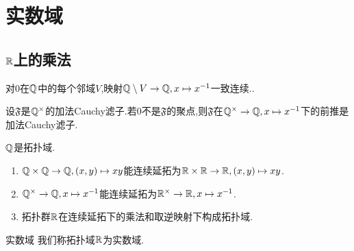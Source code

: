 \chapter{实数域}

\section{\texorpdfstring{$\mathbb{R}$}{R}上的乘法}

\begin{lemma}{}{}
	对$0$在$\mathbb{Q}$中的每个邻域$V$,映射$\mathbb{Q}\setminus V\to\mathbb{Q},x\mapsto x^{-1}$一致连续..
\end{lemma}

\begin{lemma}{}{}
	设$\mathfrak{F}$是$\mathbb{Q}^{\times}$的加法Cauchy滤子.若$0$不是$\mathfrak{F}$的聚点,则$\mathfrak{F}$在$\mathbb{Q}^{\times}\to\mathbb{Q},x\mapsto x^{-1}$下的前推是加法Cauchy滤子.
\end{lemma}

\begin{proposition}{}{}
	$\mathbb{Q}$是拓扑域.
\end{proposition}

\begin{proposition}{}{}
	\begin{enumerate}
		\item $\mathbb{Q}\times\mathbb{Q}\to\mathbb{Q},\left(x,y\right)\mapsto xy$能连续延拓为$\mathbb{R}\times\mathbb{R}\to\mathbb{R},\left(x,y\right)\mapsto xy$.
		\item $\mathbb{Q}^{\times}\to\mathbb{Q},x\mapsto x^{-1}$能连续延拓为$\mathbb{R}^{\times}\to\mathbb{R},x\mapsto x^{-1}$.
		\item 拓扑群$\mathbb{R}$在连续延拓下的乘法和取逆映射下构成拓扑域.
	\end{enumerate}
\end{proposition}

\begin{definition}{实数域}{}
	我们称拓扑域$\mathbb{R}$为实数域.
\end{definition}